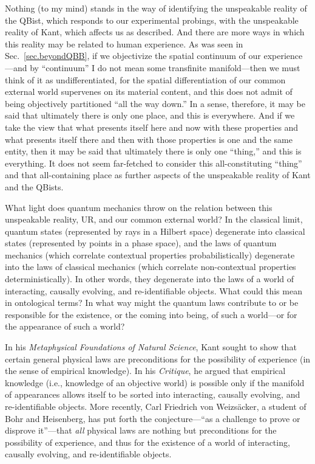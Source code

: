 \documentclass[smallextended]{svjour3}
\begin{document}
Nothing (to my mind) stands in the way of identifying the unspeakable reality of the QBist, which responds to our experimental probings, with the unspeakable reality of Kant, which affects us as described. And there are more ways in which this reality may be related to human experience. As was seen in Sec.~\ref{sec.beyondQBB}, if we objectivize the spatial continuum of our experience---and by ``continuum'' I do not mean some transfinite manifold---then we must think of it as undifferentiated, for the spatial differentiation of our common external world supervenes on its material content, and this does not admit of being objectively partitioned ``all the way down.'' In a sense, therefore, it may be said that ultimately there is only one place, and this is everywhere. And if we take the view that what presents itself here and now with these properties and what presents itself there and then with those properties is one and the same entity, then it may be said that ultimately there is only one ``thing,'' and this {is} everything. It does not seem far-fetched to consider this all-constituting ``thing'' and that all-containing place as further aspects of the unspeakable reality of Kant and the QBists.

What light does quantum mechanics throw on the relation between this unspeakable reality, UR, and our common external world? In the classical limit, quantum states (represented by rays in a Hilbert space) degenerate into classical states (represented by points in a phase space), and the laws of quantum mechanics (which correlate contextual properties {probabilistically}) degenerate into the laws of classical mechanics (which correlate non-contextual properties {deterministically}). In other words, they degenerate into the laws of a world of interacting, causally evolving, and re-identifiable objects. What could this mean in ontological terms? In what way might the quantum laws contribute to or be responsible for the existence, or the coming into being, of such a world---or for the {appearance} of such a world?

In his \emph{Metaphysical Foundations of Natural Science},\cite{KantMFNS} Kant sought to show that certain general physical laws are preconditions for the possibility of experience (in the sense of empirical knowledge). In his \emph{Critique}, he argued that empirical knowledge (i.e., knowledge of an objective world) is possible only if the manifold of appearances allows itself to be sorted into interacting, causally evolving, and re-identifiable objects. More recently, Carl Friedrich von Weizs\"acker,\cite{vW1} a student of Bohr and Heisenberg, has put forth the conjecture---``as a challenge to prove or disprove it''---that \emph{all} physical laws are nothing but preconditions for the possibility of experience, and thus for the existence of a world of interacting, causally evolving, and re-identifiable objects.
\end{document}
